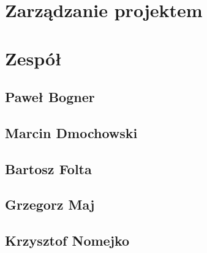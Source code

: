 \documentclass[11pt, a4paper]{article}
\begin{document}
	

	\section{Zarządzanie projektem}
		


%









	\section{Zespół}
		\subsection{Paweł Bogner}
			
		\subsection{Marcin Dmochowski}
			
		\subsection{Bartosz Folta}
			
		\subsection{Grzegorz Maj}
			
		\subsection{Krzysztof Nomejko}
			
\end{document}

